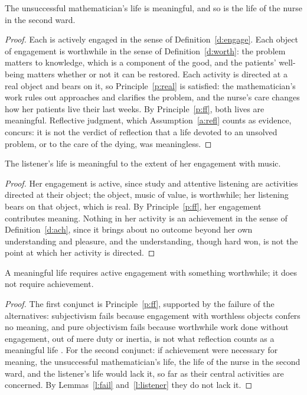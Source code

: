 \documentclass{situationist-preprint}
\begin{document}
\begin{lemma}\label{l:fail}
The unsuccessful mathematician's life is meaningful, and so is the life of the nurse in the second ward.
\end{lemma}

\begin{proof}
Each is actively engaged in the sense of Definition~\ref{d:engage}. Each object of engagement is worthwhile in the sense of Definition~\ref{d:worth}: the problem matters to knowledge, which is a component of the good, and the patients' well-being matters whether or not it can be restored. Each activity is directed at a real object and bears on it, so Principle~\ref{p:real} is satisfied: the mathematician's work rules out approaches and clarifies the problem, and the nurse's care changes how her patients live their last weeks. By Principle~\ref{p:ff}, both lives are meaningful. Reflective judgment, which Assumption~\ref{a:refl} counts as evidence, concurs: it is not the verdict of reflection that a life devoted to an unsolved problem, or to the care of the dying, was meaningless.
\end{proof}

\begin{lemma}\label{l:listener}
The listener's life is meaningful to the extent of her engagement with music.
\end{lemma}

\begin{proof}
Her engagement is active, since study and attentive listening are activities directed at their object; the object, music of value, is worthwhile; her listening bears on that object, which is real. By Principle~\ref{p:ff}, her engagement contributes meaning. Nothing in her activity is an achievement in the sense of Definition~\ref{d:ach}, since it brings about no outcome beyond her own understanding and pleasure, and the understanding, though hard won, is not the point at which her activity is directed.
\end{proof}

\begin{theorem}\label{t:main}
A meaningful life requires active engagement with something worthwhile; it does not require achievement.
\end{theorem}

\begin{proof}
The first conjunct is Principle~\ref{p:ff}, supported by the failure of the alternatives: subjectivism fails because engagement with worthless objects confers no meaning, and pure objectivism fails because worthwhile work done without engagement, out of mere duty or inertia, is not what reflection counts as a meaningful life \citep{Wolf2010}. For the second conjunct: if achievement were necessary for meaning, the unsuccessful mathematician's life, the life of the nurse in the second ward, and the listener's life would lack it, so far as their central activities are concerned. By Lemmas~\ref{l:fail} and~\ref{l:listener} they do not lack it.
\end{proof}
\end{document}
